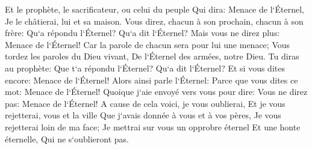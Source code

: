 \verse Et le prophète, le sacrificateur, ou celui du peuple Qui dira: Menace de l`Éternel, Je le châtierai, lui et sa maison. 
\verse Vous direz, chacun à son prochain, chacun à son frère: Qu`a répondu l`Éternel? Qu`a dit l`Éternel? 
\verse Mais vous ne direz plus: Menace de l`Éternel! Car la parole de chacun sera pour lui une menace; Vous tordez les paroles du Dieu vivant, De l`Éternel des armées, notre Dieu. 
\verse Tu diras au prophète: Que t`a répondu l`Éternel? Qu`a dit l`Éternel? 
\verse Et si vous dites encore: Menace de l`Éternel! Alors ainsi parle l`Éternel: Parce que vous dites ce mot: Menace de l`Éternel! Quoique j`aie envoyé vers vous pour dire: Vous ne direz pas: Menace de l`Éternel! 
\verse A cause de cela voici, je vous oublierai, Et je vous rejetterai, vous et la ville Que j`avais donnée à vous et à vos pères, Je vous rejetterai loin de ma face; 
\verse Je mettrai sur vous un opprobre éternel Et une honte éternelle, Qui ne s`oublieront pas. 

\chapter{}

